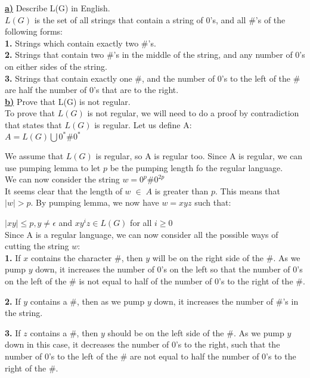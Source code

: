 \documentclass[12pt]{article}
\begin{document}
\underline{\textbf{a)}} Describe L(G) in English. \\

$L(G)$ is the set of all strings that contain a string of 0's, and all \#'s of the
following forms: \\

\textbf{1.} Strings which contain exactly two \#'s. \\
\textbf{2.} Strings that contain two \#'s in the middle of the string, and any number of 0's 
on either sides of the string. \\
\textbf{3.} Strings that contain exactly one \#, and the number of 0's to the left of the \#
are half the number of 0's that are to the right. \\

\underline{\textbf{b)}} Prove that L(G) is not regular. \\

To prove that $L(G)$ is not regular, we will need to do a proof by contradiction that
states that $L(G)$ is regular. Let us define A: \\

$A = L(G) \bigcup 0^* \# 0^*$

We assume that $L(G)$ is regular, so A is regular too. Since A is regular, we can use
pumping lemma to let $p$ be the pumping length fo the regular language. \\

We can now consider the string $w = 0^p \# 0^{2p} $ \\
It seems clear that the length of $w \; \in \; A$ is greater than $p$. This means
that $|w| > p$. By pumping lemma, we now have $w = xyz$ such that:

$|xy| \le p, y \neq \epsilon $ and $xy^iz \in L(G)$ for all $i \geq 0$ \\

\pagebreak
Since A is a regular language, we can now consider all the possible ways of cutting
the string $w$: \\

\textbf{1.} If $x$ contains the character \#, then $y$ will be on the right side of the \#.
As we pump $y$ down, it increases the number of 0's on the left so that the number of
0's on the left of the \# is not equal to half of the number of 0's to the right of the \#.

\textbf{2.} If $y$ contains a \#, then as we pump $y$ down, it increases the number of \#'s in the string.

\textbf{3.} If $z$ contains a \#, then $y$ should be on the left side of the \#. As we pump $y$ down in this
case, it decreases the number of 0's to the right, such that the number of 0's to the left of the \#
are not equal to half the number of 0's to the right of the \#. \\
\end{document}
